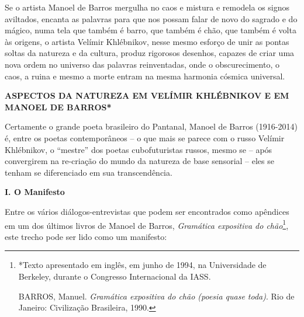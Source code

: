Se o artista Manoel de Barros mergulha no caos e mistura e remodela os
signos aviltados, encanta as palavras para que nos possam falar de novo
do sagrado e do mágico, numa tela que também é barro, que também é chão,
que também é volta às origens, o artista Velímir Khlébnikov, nesse mesmo
esforço de unir as pontas soltas da natureza e da cultura, produz
rigorosos desenhos, capazes de criar uma nova ordem no universo das
palavras reinventadas, onde o obscurecimento, o caos, a ruina e mesmo a
morte entram na mesma harmonia cósmica universal.

\textbf{ASPECTOS DA NATUREZA EM VELÍMIR KHLÉBNIKOV E EM MANOEL DE
BARROS*}

Certamente o grande poeta brasileiro do Pantanal, Manoel de Barros
(1916-2014) é, entre os poetas contemporâneos -- o que mais se parece
com o russo Velímir Khlébnikov, o ``mestre'' dos poetas cubofuturistas
russos, mesmo se -- após convergirem na re-criação do mundo da natureza
de base sensorial -- eles se tenham se diferenciado em sua
transcendência.

\textbf{I. O Manifesto}

Entre os vários diálogos-entrevistas que podem ser encontrados como
apêndices em um dos últimos livros de Manoel de Barros, \emph{Gramática
expositiva do chão}\footnote{*Texto apresentado em inglês, em junho de
  1994, na Universidade de Berkeley, durante o Congresso Internacional
  da IASS.

  BARROS, Manuel. \emph{Gramática expositiva do chão (poesia quase
  toda)}. Rio de Janeiro: Civilização Brasileira, 1990.}, este trecho
pode ser lido como um manifesto:

